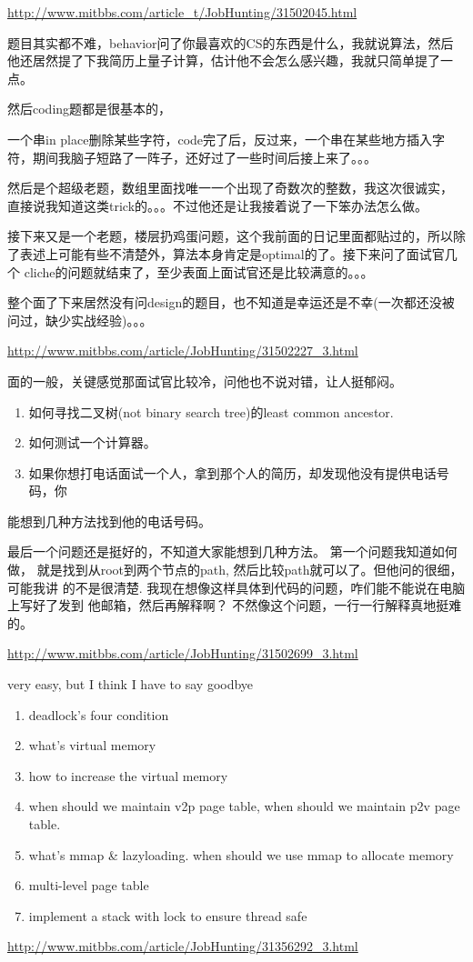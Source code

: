 \documentclass[12pt]{book}
\begin{document}
\url{http://www.mitbbs.com/article_t/JobHunting/31502045.html}

题目其实都不难，behavior问了你最喜欢的CS的东西是什么，我就说算法，然后他还居然提了下我简历上量子计算，估计他不会怎么感兴趣，我就只简单提了一点。

然后coding题都是很基本的，

一个串in place删除某些字符，code完了后，反过来，一个串在某些地方插入字符，期间我脑子短路了一阵子，还好过了一些时间后接上来了。。。

然后是个超级老题，数组里面找唯一一个出现了奇数次的整数，我这次很诚实，
直接说我知道这类trick的。。。不过他还是让我接着说了一下笨办法怎么做。

接下来又是一个老题，楼层扔鸡蛋问题，这个我前面的日记里面都贴过的，所以除了表述上可能有些不清楚外，算法本身肯定是optimal的了。接下来问了面试官几个 cliche的问题就结束了，至少表面上面试官还是比较满意的。。。

整个面了下来居然没有问design的题目，也不知道是幸运还是不幸(一次都还没被问过，缺少实战经验)。。。

\url{http://www.mitbbs.com/article/JobHunting/31502227_3.html}

面的一般，关键感觉那面试官比较冷，问他也不说对错，让人挺郁闷。
\begin{enumerate}
\item 如何寻找二叉树(not binary search tree)的least common ancestor.
\item 如何测试一个计算器。
\item 如果你想打电话面试一个人，拿到那个人的简历，却发现他没有提供电话号码，你
\end{enumerate}
能想到几种方法找到他的电话号码。

最后一个问题还是挺好的，不知道大家能想到几种方法。 第一个问题我知道如何做，
就是找到从root到两个节点的path, 然后比较path就可以了。但他问的很细，可能我讲
的不是很清楚. 我现在想像这样具体到代码的问题，咋们能不能说在电脑上写好了发到
他邮箱，然后再解释啊？ 不然像这个问题，一行一行解释真地挺难的。

\url{http://www.mitbbs.com/article/JobHunting/31502699_3.html}

very easy, but I think I have to say goodbye
\begin{enumerate}
\item deadlock's four condition
\item what's virtual memory
\item how to increase the virtual memory
\item when should we maintain v2p page table, when should we maintain p2v page table.
\item what's mmap \& lazyloading. when should we use mmap to allocate memory
\item multi-level page table
\item implement a stack with lock to ensure thread safe
\end{enumerate}
\url{http://www.mitbbs.com/article/JobHunting/31356292_3.html}
\end{document}
